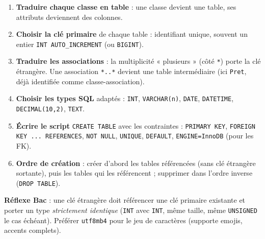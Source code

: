 \documentclass[11pt]{article}
\newcommand{\cle}[1]{{\popxbold\color{popdark}#1}}
\begin{document}
\begin{methode}
\begin{enumerate}
\item \textbf{Traduire chaque classe en table} : une classe devient une table, ses attributs deviennent des colonnes.
\item \textbf{Choisir la clé primaire} de chaque table : identifiant unique, souvent un entier \texttt{INT AUTO\_INCREMENT} (ou \texttt{BIGINT}).
\item \textbf{Traduire les associations} : la multiplicité « plusieurs » (côté \texttt{*}) porte la \cle{clé étrangère}. Une association \texttt{*..*} devient une table intermédiaire (ici \texttt{Pret}, déjà identifiée comme classe-association).
\item \textbf{Choisir les types SQL} adaptés : \texttt{INT}, \texttt{VARCHAR(n)}, \texttt{DATE}, \texttt{DATETIME}, \texttt{DECIMAL(10,2)}, \texttt{TEXT}.
\item \textbf{Écrire le script} \texttt{CREATE TABLE} avec les contraintes : \texttt{PRIMARY KEY}, \texttt{FOREIGN KEY ... REFERENCES}, \texttt{NOT NULL}, \texttt{UNIQUE}, \texttt{DEFAULT}, \texttt{ENGINE=InnoDB} (pour les FK).
\item \textbf{Ordre de création} : créer d'abord les tables référencées (sans clé étrangère sortante), puis les tables qui les référencent ; supprimer dans l'ordre inverse (\texttt{DROP TABLE}).
\end{enumerate}
\textbf{Réflexe Bac} : une clé étrangère doit référencer une clé primaire existante et porter un type \emph{strictement identique} (\texttt{INT} avec \texttt{INT}, même taille, même \texttt{UNSIGNED} le cas échéant). Préférer \texttt{utf8mb4} pour le jeu de caractères (supporte emojis, accents complets).
\end{methode}
\end{document}
